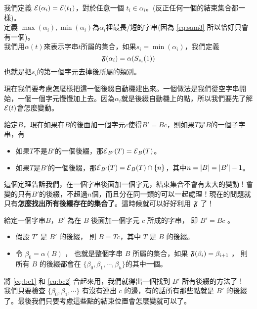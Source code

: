 \documentclass[a4paper,12pt]{book}
\begin{document}
\begin{theorem}[定理]
  我們定義 $\operatorname{\mathcal{E}}(\alpha_i) = \operatorname{\mathcal{E}}(t_1)$，對於任意一個 $t_i \in \alpha_i$。(反正任何一個的結束集合都一樣)。\\
  定義 $\max(\alpha_i), \min(\alpha_i)$為$\alpha_i$裡最長/短的字串(因為 \eqref{eq:sam3} 所以恰好只會有一個)。\\
  我們用$\alpha(t)$來表示字串$t$所屬的集合，如果$s_i = \min(\alpha_i)$，我們定義
  \[
    \operatorname{\mathfrak{F}}(\alpha_i) = \alpha(S_{s_i}(1))
  \]
  也就是把$s_i$的第一個字元去掉後所屬的類別。
\end{theorem}

現在我們要考慮怎麼樣把這一個後綴自動機建出來。一個做法是我們從空字串開始，一個一個字元慢慢加上去。因為$\alpha_i$就是後綴自動機上的點，所以我們要先了解$\operatorname{\mathcal{E}}(t)$會怎麼變動。
\begin{theorem}[定理]
  給定$B$，現在如果在$B$的後面加一個字元$c$使得$B' = Bc$，則如果$T$是$B$的一個子字串，有
  \begin{itemize}
    \item 如果$T$不是$B'$的一個後綴，那$\operatorname{\mathcal{E}}_{B'}(T) = \operatorname{\mathcal{E}}_B(T)$。
    \item 如果$T$是$B'$的一個後綴，那$\operatorname{\mathcal{E}}_{B'}(T) = \operatorname{\mathcal{E}}_B(T) \cap \{n\}$，其中$n = \lvert B \rvert = \lvert B' \rvert - 1$。
  \end{itemize}
\end{theorem}
這個定理告訴我們，在一個字串後面加一個字元，結束集合不會有太大的變動！會變的只有$B'$的後綴，不超過$n$個，而且分在同一類的可以一起處理！現在的問題就只有{\bf 怎麼找出所有後綴存在的集合了}。這時候就可以好好利用 $\operatorname{\mathfrak{F}}$ 了！

\begin{theorem}[定理]
  給定一個字串$B$，$B'$ 為在 $B$ 後面加一個字元 $c$ 所成的字串， 即 $B' = B c $ 。
  \begin{itemize}
    \item 假設 $T'$ 是 $B'$ 的後綴， 則 $B = Tc$，其中 $T$ 是 $B$ 的後綴。
      \listeqn  \label{eq:bc1}
    \item 令 $\beta_0 = \alpha(B)$ ， 也就是整個字串 $B$ 所屬的集合，如果  $\operatorname{\mathfrak{F}}(\beta_i) = \beta_{i+1}$ ， 則所有 $B$ 的後綴都會在 $\{ \beta_0, \beta_1, \cdots, \beta_h \}$的其中一個。 \listeqn \label{eq:bc2}
  \end{itemize}
\end{theorem}

將 \eqref{eq:bc1} 和 \eqref{eq:bc2} 合起來用，我們就得出一個找到 $B'$ 所有後綴的方法了！ 我們只要檢查 $\{ \beta_0, \beta_1, \cdots \}$ 有沒有連出 $c$ 的邊，有的話所有那些點就是 $B'$ 的後綴了。最後我們只要考慮這些點的結束位置會怎麼變就可以了。
\end{document}
